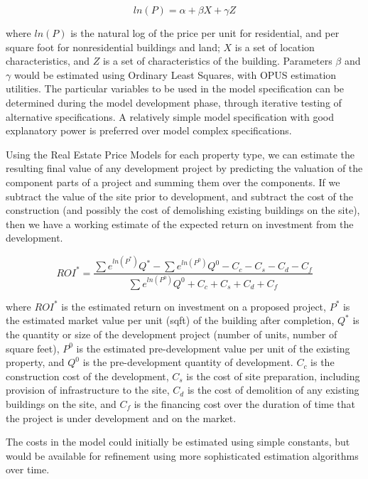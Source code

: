 \begin{equation}
ln(P) = \alpha + \beta X + \gamma Z
\end{equation}

where $ln(P)$ is the natural log of the price per unit for residential, and per square foot for nonresidential 
buildings and land; $X$ is a set of location characteristics, and $Z$ is a set of characteristics of the 
building.  Parameters $\beta$ and $\gamma$ would be estimated using Ordinary Least Squares, with OPUS
estimation utilities.  The particular variables to be used in the model specification can be determined
during the model development phase, through iterative testing of alternative specifications.  A relatively
simple model specification with good explanatory power is preferred over model complex specifications.

Using the Real Estate Price Models for each property type, we can estimate the resulting final value of any
development project by predicting the valuation of the component parts of a project and summing them
over the components.  If we subtract the value of the site prior to development, and subtract the
cost of the construction (and possibly the cost of demolishing existing buildings on the site), then
we have a working estimate of the expected return on investment from the development.

\begin{equation}
ROI^* = \frac{\sum{e^{ln(P^*)}Q^*}-\sum{e^{ln(P^0)}Q^0 - C_c - C_s - C_d - C_f}}{\sum{e^{ln(P^0)}Q^0 + C_c + C_s + C_d + C_f}}
\end{equation}

where $ROI^*$ is the estimated return on investment on a proposed project, $P^*$ is the estimated market value per unit (sqft)
of the building after completion, $Q^*$ is the quantity or size of the development project (number of units, number of square feet),
$P^0$ is the estimated pre-development value per unit of the existing property, and $Q^0$ is the pre-development quantity
of development.  $C_c$ is the construction cost of the development, $C_s$ is the cost of site preparation, including provision of 
infrastructure to the site, $C_d$ is the cost of demolition of any existing buildings on the site, and $C_f$ is the financing cost over
the duration of time that the project is under development and on the market. 

The costs in the model could initially be estimated using simple constants, but would be available for refinement using more
sophisticated estimation algorithms over time.

